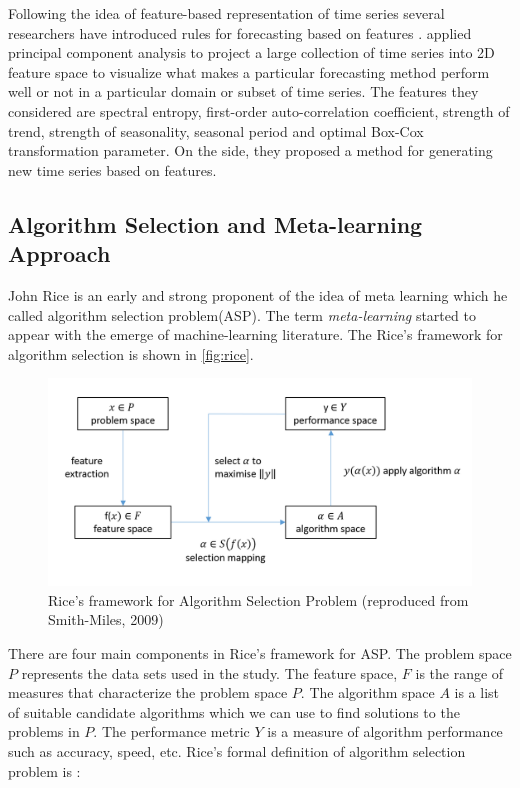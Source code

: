 \documentclass[11pt,a4paper,]{article}
\theoremstyle{definition}
\theoremstyle{definition}
\theoremstyle{definition}
\theoremstyle{remark}
\begin{document}
Following the idea of feature-based representation of time series
several researchers have introduced rules for forecasting based on
features \autocites{collopy1992rule}{adya2001automatic}{wang2009rule}.
\textcite{kang2017visualising} applied principal component analysis to
project a large collection of time series into 2D feature space to
visualize what makes a particular forecasting method perform well or not
in a particular domain or subset of time series. The features they
considered are spectral entropy, first-order auto-correlation
coefficient, strength of trend, strength of seasonality, seasonal period
and optimal Box-Cox transformation parameter. On the side, they proposed
a method for generating new time series based on features.

\subsection{Algorithm Selection and Meta-learning
Approach}\label{algorithm-selection-and-meta-learning-approach}

John Rice is an early and strong proponent of the idea of meta learning
which he called algorithm selection problem(ASP)\autocite{rice1976}. The
term \emph{meta-learning} started to appear with the emerge of
machine-learning literature. The Rice's framework for algorithm
selection is shown in \autoref{fig:rice}.

\begin{figure}

{\centering \includegraphics[width=\textwidth]{figures/RiceFramework} 

}

\caption{Rice's framework for Algorithm Selection Problem (reproduced from Smith-Miles, 2009)}\label{fig:rice}
\end{figure}

There are four main components in Rice's framework for ASP. The problem
space \(P\) represents the data sets used in the study. The feature
space, \(F\) is the range of measures that characterize the problem
space \(P\). The algorithm space \(A\) is a list of suitable candidate
algorithms which we can use to find solutions to the problems in \(P\).
The performance metric \(Y\) is a measure of algorithm performance such
as accuracy, speed, etc. Rice's formal definition of algorithm selection
problem is \autocite{smith2009cross}:
\end{document}
